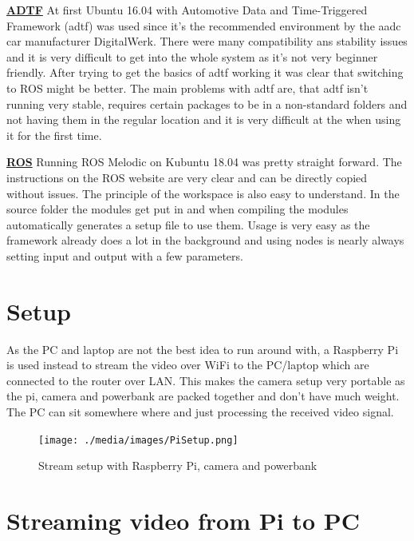 \textbf{\underline{ADTF}} \newline
At first Ubuntu 16.04 with Automotive Data and Time-Triggered Framework (\gls{adtf}) was used since it's the recommended environment by the \gls{aadc} car manufacturer DigitalWerk. There were many compatibility ans stability issues and it is very difficult to get into the whole system as it's not very beginner friendly. After trying to get the basics of \gls{adtf} working it was clear that switching to ROS might be better. The main problems with \gls{adtf} are, that \gls{adtf} isn't running very stable, requires certain packages to be in a non-standard folders and not having them in the regular location and it is very difficult at the when using it for the first time.

\textbf{\underline{ROS}} \newline
Running ROS Melodic on Kubuntu 18.04 was pretty straight forward. The instructions on the ROS website are very clear and can be directly copied without issues. The principle of the workspace is also easy to understand. In the source folder the modules get put in and when compiling the modules automatically generates a setup file to use them. Usage is very easy as the framework already does a lot in the background and using nodes is nearly always setting input and output with a few parameters.


\section{Setup\authorA}
As the PC and laptop are not the best idea to run around with, a Raspberry Pi is used instead to stream the video over WiFi to the PC/laptop which are connected to the router over LAN. This makes the camera setup very portable as the pi, camera and powerbank are packed together and don't have much weight. The PC can sit somewhere where and just processing the received video signal.
\begin{figure}[h]
	\centering
	\texttt{[image: ./media/images/PiSetup.png]}
  	\caption{Stream setup with Raspberry Pi, camera and powerbank}
  	\label{picamssetup}
\end{figure}

\section{Streaming video from Pi to PC\authorA}

